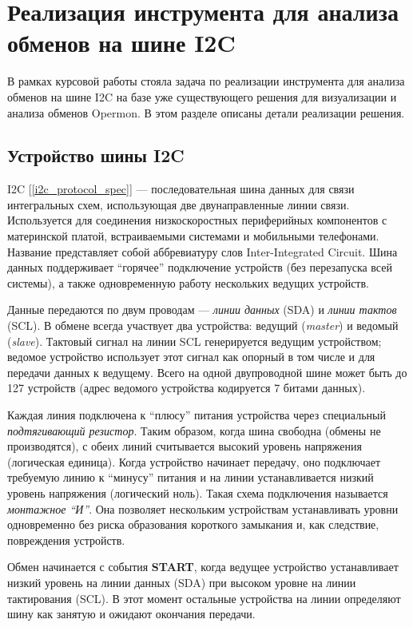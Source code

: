 \section{Реализация инструмента для анализа обменов на шине I2C}

В рамках курсовой работы стояла задача по реализации инструмента для анализа обменов на шине I2C на базе уже существующего решения для визуализации и анализа обменов Opermon. В этом разделе описаны детали реализации решения.

\subsection{Устройство шины I2C}

I2C [\ref{i2c_protocol_spec}] — последовательная шина данных для связи интегральных схем, использующая две двунаправленные линии связи. Используется для соединения низкоскоростных периферийных компонентов с материнской платой, встраиваемыми системами и мобильными телефонами. Название представляет собой аббревиатуру слов Inter-Integrated Circuit. Шина данных поддерживает ``горячее'' подключение устройств (без перезапуска всей системы), а также одновременную работу нескольких ведущих устройств.

Данные передаются по двум проводам — \textit{линии данных} (SDA) и \textit{линии тактов} (SCL). В обмене всегда участвует два устройства: ведущий (\textit{master}) и ведомый (\textit{slave}). Тактовый сигнал на линии SCL генерируется ведущим устройством; ведомое устройство использует этот сигнал как опорный в том числе и для передачи данных к ведущему. Всего на одной двупроводной шине может быть до 127 устройств (адрес ведомого устройства кодируется 7 битами данных).

Каждая линия подключена к ``плюсу'' питания устройства через специальный \textit{подтягивающий резистор}. Таким образом, когда шина свободна  (обмены не производятся), с обеих линий считывается высокий уровень напряжения (логическая единица). Когда устройство начинает передачу, оно подключает требуемую линию к ``минусу'' питания и на линии устанавливается низкий уровень напряжения (логический ноль). Такая схема подключения называется \textit{монтажное ``И''}. Она позволяет нескольким устройствам устанавливать уровни одновременно без риска образования короткого замыкания и, как следствие, повреждения устройств.

Обмен начинается с события \textbf{START}, когда ведущее устройство устанавливает низкий уровень на линии данных (SDA) при высоком уровне на линии тактирования (SCL). В этот момент остальные устройства на линии определяют шину как занятую и ожидают окончания передачи.

